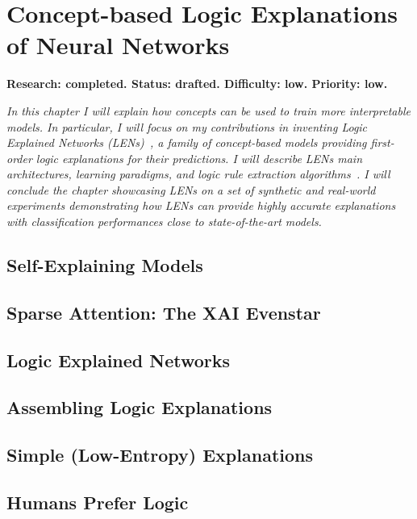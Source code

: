 \documentclass[withindex,glossary]{cam-thesis}
\begin{document}
\chapter{Concept-based Logic Explanations of Neural Networks} \label{chapter:lens}
\textbf{Research: completed. Status: drafted. Difficulty: low. Priority: low.}

\textit{In this chapter I will explain how concepts can be used to train more interpretable models. In particular, I will focus on my contributions in inventing Logic Explained Networks (LENs)~\citep{ciravegna2021logic}, a family of concept-based models providing first-order logic explanations for their predictions. I will describe LENs main architectures, learning paradigms, and logic rule extraction algorithms~\citep{barbiero2021entropy}. I will conclude the chapter showcasing LENs on a set of synthetic and real-world experiments demonstrating how LENs can provide highly accurate explanations with classification performances close to state-of-the-art models.}

\section{Self-Explaining Models}

\section{Sparse Attention: The XAI Evenstar}

\section{Logic Explained Networks}

\section{Assembling Logic Explanations}

\section{Simple (Low-Entropy) Explanations}

\section{Humans Prefer Logic}
\end{document}
